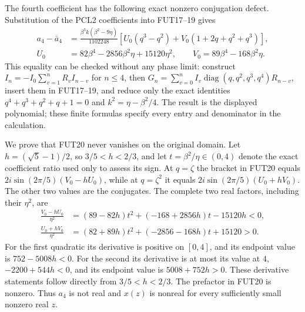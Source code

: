 \documentclass[11pt]{article}
\begin{document}
The fourth coefficient has the following exact nonzero conjugation
defect. Substitution of the PCL2 coefficients into FUT17--19 gives
\[
 \begin{split}
 a_4-\bar a_4
 &=\frac{\beta^3k(\beta^2-9\eta)}{1102248}
   \left[U_0(q^3-q^2)+V_0(1+2q+q^2+q^3)\right],\\
 U_0&=82\beta^4-2856\beta^2\eta+15120\eta^2,\qquad
 V_0=89\beta^4-168\beta^2\eta.
 \end{split}\tag{FUT20}
\]
This equality can be checked without any phase limit: construct
$I_n=-I_0\sum_{v=1}^nR_vI_{n-v}$ for $n\le4$, then
$G_n=\sum_{v=0}^nI_v\operatorname{diag}(q,q^2,q^3,q^4)R_{n-v}$,
insert them in FUT17--19, and reduce only the exact identities
$q^4+q^3+q^2+q+1=0$ and $k^2=\eta-\beta^2/4$.
The result is the displayed polynomial; these finite formulas specify
every entry and denominator in the calculation.

We prove that FUT20 never vanishes on the original domain.
Let $h=(\sqrt5-1)/2$, so $3/5<h<2/3$, and let
$t=\beta^2/\eta\in(0,4)$ denote the exact coefficient ratio used
only to assess its sign. At $q=\zeta$ the bracket in FUT20 equals
$2i\sin(2\pi/5)(V_0-hU_0)$, while at $q=\zeta^2$ it equals
$2i\sin(2\pi/5)(U_0+hV_0)$. The other two values are the conjugates.
The complete two real factors, including their $\eta^2$, are
\[
 \begin{split}
 \frac{V_0-hU_0}{\eta^2}
 &=(89-82h)t^2+(-168+2856h)t-15120h<0,\\
 \frac{U_0+hV_0}{\eta^2}
 &=(82+89h)t^2+(-2856-168h)t+15120>0.
 \end{split}\tag{FUT21}
\]
For the first quadratic its derivative is positive on $[0,4]$,
and its endpoint value is $752-5008h<0$.
For the second its derivative is at most its value at $4$,
$-2200+544h<0$, and its endpoint value is $5008+752h>0$.
These derivative statements follow directly from $3/5<h<2/3$.
The prefactor in FUT20 is nonzero. Thus $a_4$ is not real and
$x(z)$ is nonreal for every sufficiently small nonzero real $z$.
\end{document}
